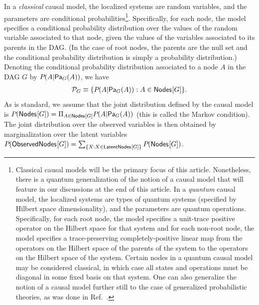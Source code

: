 In a {\em classical} causal model, the localized systems are random variables, and the parameters are conditional probabilities\footnote{Classical causal models will be the primary focus of this article. Nonetheless, there is a quantum generalization of the notion of a causal model that will feature in our discussions at the end of this article.  In a {\em quantum} causal model\cite{leifer2013conditionalstates}, the localized systems are types of quantum systems (specified by Hilbert space dimensionality), and the parameters are quantum operations.  Specifically, for each root node, the model specifies a unit-trace positive operator on the Hilbert space for that system and for each non-root node, the model specifies a trace-preserving completely-positive linear map from the operators on the Hilbert space of the parents of the system to the operators on the Hilbert space of the system.  Certain nodes in a quantum causal model may be considered classical, in which case all states and operations must be diagonal in some fixed basis on that system.  One can also generalize the notion of a causal model further still to the case of generalized probabilistic theories, as was done in Ref.~\cite{pusey2014gdag}.
}.
Specifically, for each node, the model specifies a conditional probability distribution over the values of the random variable associated to that node, given the values of the variables associated to its parents in the DAG.  (In the case of root nodes, the parents are the null set and the conditional probability distribution is simply a probability distribution.)
Denoting the conditional probability distribution associated to a node $A$ in the DAG $G$ by $\pdf{A|\Pa[G]{A}}$, we have
\begin{align}
\mathcal{P}_G \equiv \{\pdf{A|\Pa[G]{A}}: A \in \SmallNamedFunction{Nodes}{G}\}.
\end{align}
As is standard, we assume that the joint distribution defined by the causal model is $\pdf{\SmallNamedFunction{Nodes}{G}} = \Pi_{A\in \SmallNamedFunction{Nodes}{G}} \pdf{A|\Pa[G]{A}}$ (this is called the Markov condition).  The joint distribution over the observed variables is then obtained by marginalization over the latent variables $\pdf{\SmallNamedFunction{ObservedNodes}{G}} =  \sum_{\{X :X \in\SmallNamedFunction{LatentNodes}{G}\}} \pdf{\SmallNamedFunction{Nodes}{G}}$.

